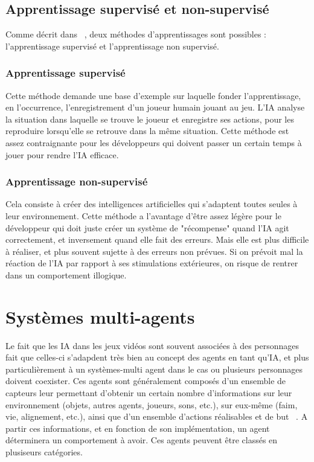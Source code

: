 \documentclass[asi]{picINSAIA}
\begin{document}
\section{Apprentissage supervisé et non-supervisé}
Comme décrit dans ~\cite{tambellinicomment}, deux méthodes d’apprentissages sont possibles : l’apprentissage supervisé et l’apprentissage non supervisé.
\subsection{Apprentissage supervisé}
Cette méthode demande une base d’exemple sur laquelle fonder l’apprentissage, en l’occurrence, l’enregistrement d’un joueur humain jouant au jeu. L’IA analyse la situation dans laquelle se trouve le joueur et enregistre ses actions, pour les reproduire lorsqu’elle se retrouve dans la même situation. Cette méthode est assez contraignante pour les développeurs qui doivent passer un certain temps à jouer pour rendre l’IA efficace.
\subsection{Apprentissage non-supervisé}
Cela consiste à créer des intelligences artificielles qui s’adaptent toutes seules à leur environnement. Cette méthode a l’avantage d’être assez légère pour le développeur qui doit juste créer un système de "récompense" quand l’IA agit correctement, et inversement quand elle fait des erreurs. Mais elle est plus difficile à réaliser, et plus souvent sujette à des erreurs non prévues. Si on prévoit mal la réaction de l’IA par rapport à ses stimulations extérieures, on risque de rentrer dans un comportement illogique.


\chapter{Systèmes multi-agents}
Le fait que les IA dans les jeux vidéos sont souvent associées à des personnages fait que celles-ci s'adapdent très bien au concept des agents en tant qu'IA, et plus particulièrement à un systèmes-multi agent dans le cas ou plusieurs personnages doivent coexister.
Ces agents sont généralement composés d'un ensemble de capteurs leur permettant d'obtenir un certain nombre d'informations sur leur environnement (objets, autres agents, joueurs, sons, etc.), sur eux-même (faim, vie, alignement, etc.), ainsi que d'un ensemble d'actions réalisables et de but ~\cite{IntelAgents4CompGames}. A partir ces informations, et en fonction de son implémentation, un agent déterminera un comportement à avoir.
Ces agents peuvent être classés en plusiseurs catégories.
\end{document}
